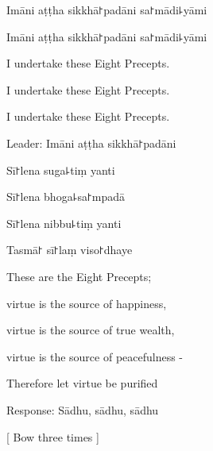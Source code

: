 Imāni aṭṭha sikkhā꜓padāni sa꜓mādi꜕yāmi

Imāni aṭṭha sikkhā꜓padāni sa꜓mādi꜕yāmi

I undertake these Eight Precepts.

I undertake these Eight Precepts.

I undertake these Eight Precepts.

Leader: Imāni aṭṭha sikkhā꜓padāni

Sī꜓lena suga꜕tiṃ yanti

Sī꜓lena bhoga꜕sa꜓mpadā

Sī꜓lena nibbu꜕tiṃ yanti

Tasmā꜓ sī꜓laṃ viso꜓dhaye

These are the Eight Precepts;

virtue is the source of happiness,

virtue is the source of true wealth,

virtue is the source of peacefulness -

Therefore let virtue be purified

Response: Sādhu, sādhu, sādhu

[ Bow three times ]

%
%
%
%
%
%
%
%
%
